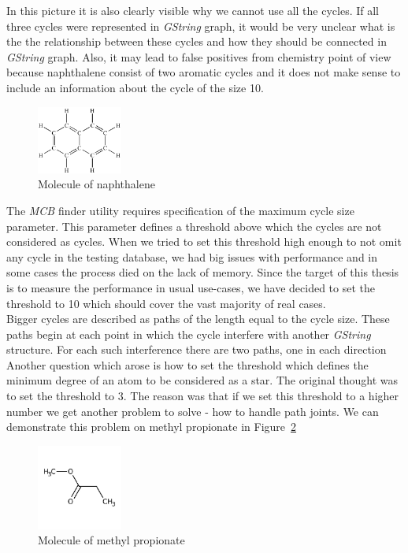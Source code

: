{In this picture it is also clearly visible why we cannot use all the cycles. If all three cycles were represented in \textit{GString} graph, it would be very unclear what is the the relationship between these cycles and how they should be connected in \textit{GString} graph. Also, it may lead to false positives from chemistry point of view because naphthalene consist of two aromatic cycles and it does not make sense to include an information about the cycle of the size 10.\\

\begin{figure}[h]
	\centering
	\includegraphics[width=0.25\textwidth]{../img/naphthalene01.pdf}
	\caption{Molecule of naphthalene}
	\label{fig:naphthalene}
\end{figure}

The \textit{MCB} finder utility requires specification of the maximum cycle size parameter. This parameter defines a threshold above which the cycles are not considered as cycles. When we tried to set this threshold high enough to not omit any cycle in the testing database, we had big issues with performance and in some cases the process died on the lack of memory. Since the target of this thesis is to measure the performance in usual use-cases, we have decided to set the threshold to 10 which should cover the vast majority of real cases.\\

Bigger cycles are described as paths of the length equal to the cycle size. These paths begin at each point in which the cycle interfere with another \textit{GString} structure. For each such interference there are two paths, one in each direction\\

Another question which arose is how to set the threshold which defines the minimum degree of an atom to be considered as a star. The original thought was to set the threshold to 3. The reason was that if we set this threshold to a higher number we get another problem to solve - how to handle path joints. We can demonstrate this problem on methyl propionate in Figure~\ref{fig:methyl-propionate}\\

\begin{figure}[h]
	\centering
	\includegraphics[width=0.25\textwidth]{../img/methyl-propionate.pdf}
	\caption{Molecule of methyl propionate}
	\label{fig:methyl-propionate}
\end{figure}

}
